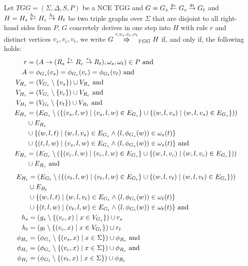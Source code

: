 \documentclass[runningheads]{llncs}
\begin{document}
\begin{definition}
	\label{def:tgg_dstep}
	Let $\mathit{TGG} = (\Sigma, \Delta, S, P)$ be a NCE TGG and $G = G_s \overset{g_s}{\leftarrow} G_c \overset{g_t}{\rightarrow} G_t$ and $H = H_s \overset{h_s}{\leftarrow} H_c \overset{h_t}{\rightarrow} H_t$ be two triple graphs over $\Sigma$ that are disjoint to all right-hand sides from $P$, $G$ concretely derives in one step into $H$ with rule $r$ and distinct vertices $v_s, v_c, v_t$, we write $G \tcderiv{r}{v_s,v_c,v_t}{TGG} H$ if, and only if, the following holds:
	\begin{align*}
		r & = (A \to (R_s \overset{r_s}{\leftarrow} R_c \overset{r_t}{\rightarrow} R_t), \omega_s, \omega_t) \in P \text{ and } \\
		A & = \phi_{G_s}(v_s) = \phi_{G_c}(v_c) = \phi_{G_t}(v_t) \text{ and}\\
		V_{H_s}  & = (V_{G_s} \setminus \{v_s\}) \cup V_{R_s} \text{ and}\\
		V_{H_c}  & = (V_{G_c} \setminus \{v_c\}) \cup V_{R_c} \text{ and}\\
		V_{H_t}  & = (V_{G_t} \setminus \{v_t\}) \cup V_{R_t} \text{ and}\\
		E_{H_s} & = (E_{G_s} \setminus (\{(v_s,l,w) \; | \; (v_s,l,w) \in E_{G_s}\} \cup \{(w,l,v_s) \; | \; (w,l,v_s) \in E_{G_s}\})) \\
		& \cup E_{R_s} \\
		& \cup \{(w,l,t) \; | \; (w,l,v_s) \in E_{G_s} \land (l,\phi_{G_s}(w)) \in \omega_{s}(t)\} \\
		& \cup \{(t,l,w) \; | \; (v_s,l,w) \in E_{G_s} \land (l,\phi_{G_s}(w)) \in \omega_{s}(t)\} \text{ and} \\
		E_{H_c} & = (E_{G_c} \setminus (\{(v_c,l,w) \; | \; (v_c,l,w) \in E_{G_c}\} \cup \{(w,l,v_c) \; | \; (w,l,v_c) \in E_{G_c}\})) \\
		& \cup E_{R_c} \text{ and}
	\end{align*}
	\begin{align*}
		E_{H_t} & = (E_{G_t} \setminus (\{(v_t,l,w) \; | \; (v_t,l,w) \in E_{G_t}\} \cup \{(w,l,v_t) \; | \; (w,l,v_t) \in E_{G_t}\})) \\
		& \cup E_{R_t} \\
		& \cup \{(w,l,t) \; | \; (w,l,v_t) \in E_{G_t} \land (l,\phi_{G_t}(w)) \in \omega_{t}(t)\} \\
		& \cup \{(t,l,w) \; | \; (v_t,l,w) \in E_{G_t} \land (l,\phi_{G_t}(w)) \in \omega_{t}(t)\} \text{ and} \\
		h_s		& = (g_s \setminus \{(v_c,x) \; | \; x \in V_{G_s}\}) \cup r_s  \\
		h_t		& = (g_t \setminus \{(v_c,x) \; | \; x \in V_{G_t}\}) \cup r_t  \\
		\phi_{H_s} & = (\phi_{G_s} \setminus \{(v_s,x) \; | \; x \in \Sigma\}) \cup \phi_{R_s} \text{ and}\\
		\phi_{H_c} & = (\phi_{G_c} \setminus \{(v_c,x) \; | \; x \in \Sigma\}) \cup \phi_{R_c} \text{ and}\\
		\phi_{H_t} & = (\phi_{G_t} \setminus \{(v_t,x) \; | \; x \in \Sigma\}) \cup \phi_{R_t}\\
	\end{align*}
\end{definition}
\end{document}
